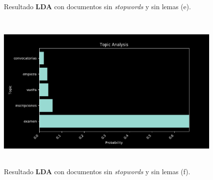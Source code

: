 \begin{itemize}
\begin{figure}[H]
            \caption{Resultado \textbf{LDA} con documentos sin \textit{stopwords} y sin lemas (e).}
            \label{fig:ns_nl-5}
        \end{figure}
        \begin{figure}[H]
            \centering
            \includegraphics[height=8cm, width=16.5cm]{Latex/Classes/Imagenes/ns_nl-6.png}
            \caption{Resultado \textbf{LDA} con documentos sin \textit{stopwords} y sin lemas (f).}
            \label{fig:ns_nl-6}
        \end{figure}
        \newpage
        

\end{itemize}
